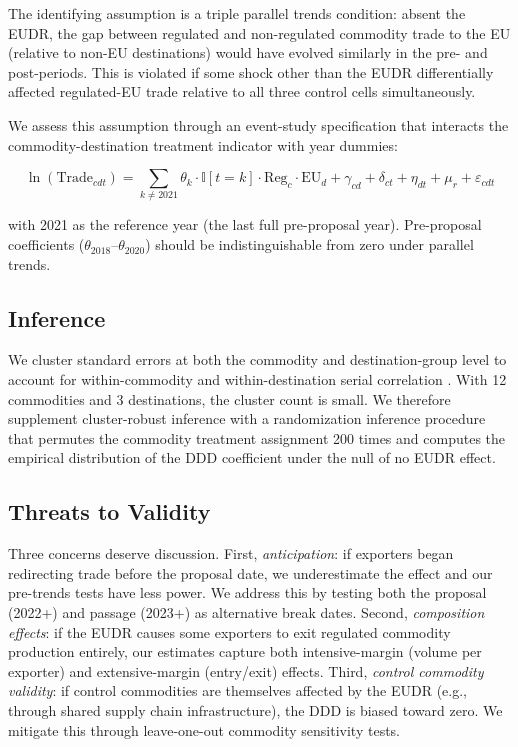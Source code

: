 \documentclass[12pt]{article}
\newcommand{\ind}{\mathbb{I}}
\begin{document}
The identifying assumption is a triple parallel trends condition: absent the EUDR, the gap between regulated and non-regulated commodity trade to the EU (relative to non-EU destinations) would have evolved similarly in the pre- and post-periods. This is violated if some shock other than the EUDR differentially affected regulated-EU trade relative to all three control cells simultaneously.

We assess this assumption through an event-study specification that interacts the commodity-destination treatment indicator with year dummies:

\begin{equation}\label{eq:event}
\ln(\text{Trade}_{cdt}) = \sum_{k \neq 2021} \theta_k \cdot \ind[t = k] \cdot \text{Reg}_c \cdot \text{EU}_d + \gamma_{cd} + \delta_{ct} + \eta_{dt} + \mu_r + \varepsilon_{cdt}
\end{equation}

\noindent with 2021 as the reference year (the last full pre-proposal year). Pre-proposal coefficients ($\theta_{2018}$--$\theta_{2020}$) should be indistinguishable from zero under parallel trends.

\subsection{Inference}

We cluster standard errors at both the commodity and destination-group level to account for within-commodity and within-destination serial correlation \citep{Cameron2011}. With 12 commodities and 3 destinations, the cluster count is small. We therefore supplement cluster-robust inference with a randomization inference procedure that permutes the commodity treatment assignment 200 times and computes the empirical distribution of the DDD coefficient under the null of no EUDR effect.

\subsection{Threats to Validity}

Three concerns deserve discussion. First, \textit{anticipation}: if exporters began redirecting trade before the proposal date, we underestimate the effect and our pre-trends tests have less power. We address this by testing both the proposal (2022+) and passage (2023+) as alternative break dates. Second, \textit{composition effects}: if the EUDR causes some exporters to exit regulated commodity production entirely, our estimates capture both intensive-margin (volume per exporter) and extensive-margin (entry/exit) effects. Third, \textit{control commodity validity}: if control commodities are themselves affected by the EUDR (e.g., through shared supply chain infrastructure), the DDD is biased toward zero. We mitigate this through leave-one-out commodity sensitivity tests.
\end{document}
